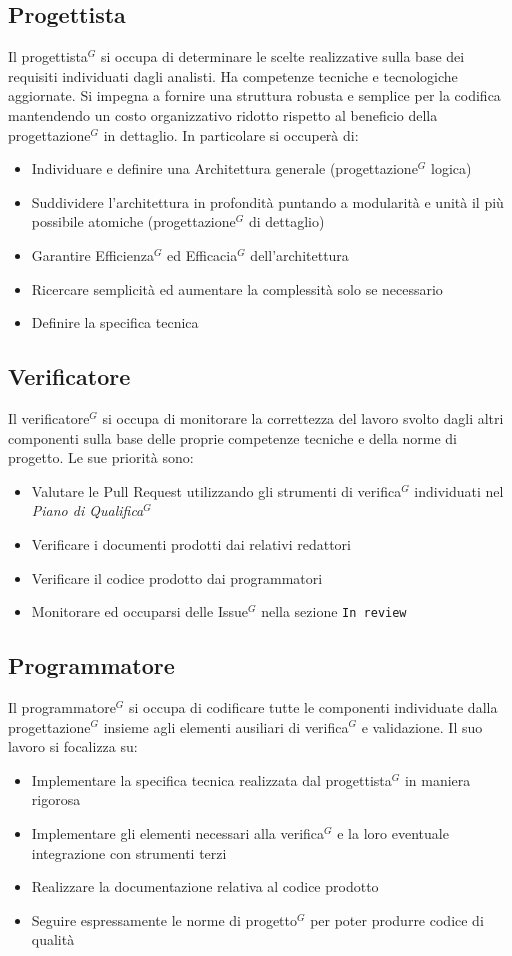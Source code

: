 \documentclass[a4paper,10pt]{article}
\begin{document}
\subsection{Progettista}
Il progettista$^G$ si occupa di determinare le scelte realizzative sulla base dei requisiti individuati dagli analisti.
Ha competenze tecniche e tecnologiche aggiornate. Si impegna a fornire una struttura robusta e semplice per la 
codifica mantendendo un costo organizzativo ridotto rispetto al beneficio della progettazione$^G$ in dettaglio.  
In particolare si occuperà di:
\begin{itemize}
  \item Individuare e definire una Architettura generale (progettazione$^G$ logica)
  \item Suddividere l'architettura in profondità puntando a modularità e unità il più possibile atomiche 
  (progettazione$^G$ di dettaglio)
  \item Garantire Efficienza$^G$ ed Efficacia$^G$ dell'architettura
  \item Ricercare semplicità ed aumentare la complessità solo se necessario
  \item Definire la specifica tecnica
\end{itemize}

\subsection{Verificatore}
Il verificatore$^G$ si occupa di monitorare la correttezza del lavoro svolto dagli altri componenti sulla base delle
proprie competenze tecniche e della norme di progetto.
Le sue priorità sono:
\begin{itemize}
\item Valutare le Pull Request utilizzando gli strumenti di verifica$^G$ individuati nel \textit{Piano di Qualifica$^G$} 
\item Verificare i documenti prodotti dai relativi redattori
\item Verificare il codice prodotto dai programmatori
\item Monitorare ed occuparsi delle Issue$^G$ nella sezione \texttt{In review} 
\end{itemize}

\subsection{Programmatore}
Il programmatore$^G$ si occupa di codificare tutte le componenti individuate dalla progettazione$^G$ insieme agli elementi
ausiliari di verifica$^G$ e validazione. Il suo lavoro si focalizza su:
\begin{itemize}
  \item Implementare la specifica tecnica realizzata dal progettista$^G$ in maniera rigorosa
  \item Implementare gli elementi necessari alla verifica$^G$ e la loro eventuale integrazione con strumenti terzi
  \item Realizzare la documentazione relativa al codice prodotto
  \item Seguire espressamente le norme di progetto$^G$ per poter produrre codice di qualità
\end{itemize}
\end{document}
